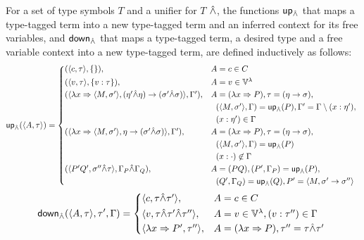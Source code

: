 \documentclass[main.tex]{subfiles}
\begin{document}
\begin{defn}
    \label{def:propagation}
    For a set of type symbols $T$ and a unifier for $T$ $\hat{\wedge}$, the functions
    $\mathsf{up}_{\hat{\wedge}}$ that maps a type-tagged term into a new type-tagged term and
    an inferred context for its free variables, and $\mathsf{down}_{\hat{\wedge}}$ that maps
    a type-tagged term, a desired type and a free variable context into a
    new type-tagged term, are defined inductively as follows:
    \[
        \mcf{up}_{\unify}(\ttt{A}{\tau}) =
        \begin{cases*}
            (\ttt{c}{\tau}, \{ \}) ,& $A = c \in C$ \\
            (\ttt{v}{\tau}, \{ v : \tau \}) ,& $A = v \in \lvars$ \\
            (\ttt{\lambda x \abstr \ttt{M}{\sigma'}}{(\eta' \unify \eta) \tot (\sigma' \unify \sigma)}, \Gamma')
 ,& $A = (\lambda x \abstr P)
                , \tau = (\eta \tot \sigma),$ \\
                \phantom{} &\phantom{, }$(\ttt{M}{\sigma'}, \Gamma) = \mcf{up}_{\unify}(P)
                , \Gamma' = \Gamma \setminus (x : \eta'),$ \\
                \phantom{} &\phantom{, }$(x : \eta') \in \Gamma$ \\
            (\ttt{\lambda x \abstr \ttt{M}{\sigma'}}{\eta \tot (\sigma' \unify \sigma)}, \Gamma')
 ,& $A = (\lambda x \abstr P)
                , \tau = (\eta \tot \sigma),$ \\
                \phantom{} &\phantom{, }$(\ttt{M}{\sigma'}, \Gamma) = \mcf{up}_{\unify}(P)$ \\
                \phantom{} &\phantom{, }$(x : \cdot) \not\in \Gamma$ \\
            (\ttt{P' Q'}{\sigma'' \unify \tau}, \Gamma_P \unify \Gamma_Q)
 ,& $A = (PQ), (P', \Gamma_P) = \mcf{up}_{\unify}(P),$ \\
                \phantom{} &\phantom{, }$(Q', \Gamma_Q) = \mcf{up}_{\unify}(Q), P' = \ttt{M}{\sigma' \tot \sigma''}$ \\
        \end{cases*}
    \]
    \[
        \mcf{down}_{\unify}(\ttt{A}{\tau}, \tau', \Gamma) =
        \begin{cases*}
            \ttt{c}{\tau \unify \tau'} ,& $A = c \in C$ \\
            \ttt{v}{\tau \unify \tau' \unify \tau''}
 ,& $A = v \in \lvars, (v : \tau'') \in \Gamma$ \\
            \ttt{\lambda x \abstr P'}{\tau''}
 ,& $A = (\lambda x \abstr P), \tau'' = \tau \unify \tau'$ \\

\end{cases*}\]
\end{defn}
\end{document}
